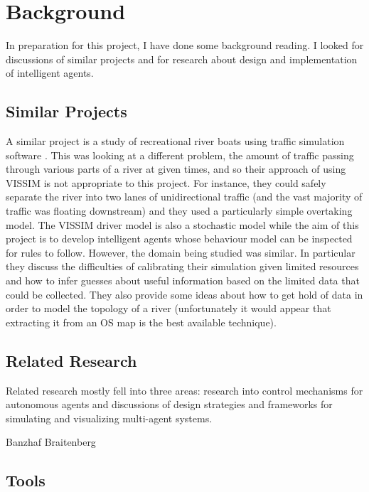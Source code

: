 \chapter{Background}
In preparation for this project, I have done some background
reading. I looked for discussions of similar projects and for research about design and implementation of intelligent agents. 

\section{Similar Projects}
A similar project is a study of recreational river boats using
traffic simulation software \cite{Lowry2011}. This was looking at a
different problem, the amount of traffic passing through various parts
of a river at given times, and so their approach of using VISSIM is
not appropriate to this project. For instance, they could safely
separate the river into two lanes of unidirectional traffic (and the
vast majority of traffic was floating downstream) and they used a
particularly simple overtaking model. The VISSIM driver model is also
a stochastic model while the aim of this project is to develop
intelligent agents whose behaviour model can be inspected for rules to
follow. However, the domain being studied was
similar. In particular they discuss the difficulties of calibrating
their simulation given limited resources and how to infer guesses
about useful information based on the limited data that could be
collected. They also provide some ideas about how to get hold of data
in order to model the topology of a river (unfortunately it would
appear that extracting it from an OS map is the best available
technique).

\section{Related Research}
Related research mostly fell into three areas: research into control mechanisms for
autonomous agents and discussions of design strategies and frameworks for simulating
and visualizing multi-agent systems.

\cite{Nguyen-Tuong2011}
\cite{Nilsson1994}
Banzhaf
Braitenberg
\section{Tools}
